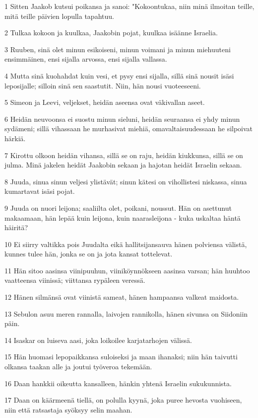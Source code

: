 \par 1 Sitten Jaakob kutsui poikansa ja sanoi: "Kokoontukaa, niin minä ilmoitan teille, mitä teille päivien lopulla tapahtuu.
\par 2 Tulkaa kokoon ja kuulkaa, Jaakobin pojat, kuulkaa isäänne Israelia.
\par 3 Ruuben, sinä olet minun esikoiseni, minun voimani ja minun miehuuteni ensimmäinen, ensi sijalla arvossa, ensi sijalla vallassa.
\par 4 Mutta sinä kuohahdat kuin vesi, et pysy ensi sijalla, sillä sinä nousit isäsi leposijalle; silloin sinä sen saastutit. Niin, hän nousi vuoteeseeni.
\par 5 Simeon ja Leevi, veljekset, heidän aseensa ovat väkivallan aseet.
\par 6 Heidän neuvoonsa ei suostu minun sieluni, heidän seuraansa ei yhdy minun sydämeni; sillä vihassaan he murhasivat miehiä, omavaltaisuudessaan he silpoivat härkiä.
\par 7 Kirottu olkoon heidän vihansa, sillä se on raju, heidän kiukkunsa, sillä se on julma. Minä jakelen heidät Jaakobin sekaan ja hajotan heidät Israelin sekaan.
\par 8 Juuda, sinua sinun veljesi ylistävät; sinun kätesi on vihollistesi niskassa, sinua kumartavat isäsi pojat.
\par 9 Juuda on nuori leijona; saaliilta olet, poikani, noussut. Hän on asettunut makaamaan, hän lepää kuin leijona, kuin naarasleijona - kuka uskaltaa häntä häiritä?
\par 10 Ei siirry valtikka pois Juudalta eikä hallitsijansauva hänen polviensa välistä, kunnes tulee hän, jonka se on ja jota kansat tottelevat.
\par 11 Hän sitoo aasinsa viinipuuhun, viiniköynnökseen aasinsa varsan; hän huuhtoo vaatteensa viinissä; viittansa rypäleen veressä.
\par 12 Hänen silmänsä ovat viinistä sameat, hänen hampaansa valkeat maidosta.
\par 13 Sebulon asuu meren rannalla, laivojen rannikolla, hänen sivunsa on Siidoniin päin.
\par 14 Isaskar on luiseva aasi, joka loikoilee karjatarhojen välissä.
\par 15 Hän huomasi lepopaikkansa suloiseksi ja maan ihanaksi; niin hän taivutti olkansa taakan alle ja joutui työveroa tekemään.
\par 16 Daan hankkii oikeutta kansalleen, hänkin yhtenä Israelin sukukunnista.
\par 17 Daan on käärmeenä tiellä, on polulla kyynä, joka puree hevosta vuohiseen, niin että ratsastaja syöksyy selin maahan.
